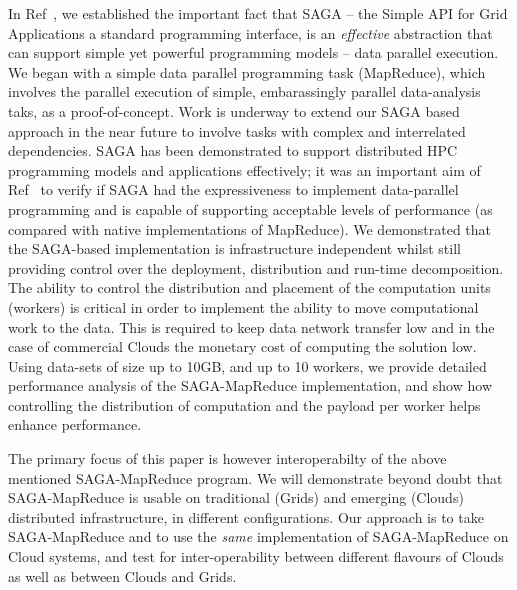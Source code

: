 \documentclass[conference,final]{IEEEtran}
\newcommand{\sagamapreduce }{SAGA-MapReduce }
\begin{document}
In Ref~\cite{saga_ccgrid09}, we established the important fact that
SAGA -- the Simple API for Grid Applications a standard programming
interface, is an {\it effective} abstraction that can support simple
yet powerful programming models -- data parallel execution.  We began
with a simple data parallel programming task (MapReduce), which
involves the parallel execution of simple, embarassingly parallel
data-analysis taks, as a proof-of-concept.  Work is underway to extend
our SAGA based approach in the near future to involve tasks with
complex and interrelated dependencies. SAGA has been demonstrated to
support distributed HPC programming models and applications
effectively; it was an important aim of Ref~\cite{saga_ccgrid09} to
verify if SAGA had the expressiveness to implement data-parallel
programming and is capable of supporting acceptable levels of
performance (as compared with native implementations of MapReduce).
We demonstrated that the SAGA-based implementation is infrastructure
independent whilst still providing control over the deployment,
distribution and run-time decomposition.  The ability to control the
distribution and placement of the computation units (workers) is
critical in order to implement the ability to move computational work
to the data. This is required to keep data network transfer low and in
the case of commercial Clouds the monetary cost of computing the
solution low. Using data-sets of size up to 10GB, and up to 10
workers, we provide detailed performance analysis of the
SAGA-MapReduce implementation, and show how controlling the
distribution of computation and the payload per worker helps enhance
performance.

The primary focus of this paper is however interoperabilty of the
above mentioned \sagamapreduce program.  We will demonstrate beyond
doubt that \sagamapreduce is usable on traditional (Grids) and
emerging (Clouds) distributed infrastructure, in different
configurations. Our approach is to take \sagamapreduce and to use the
{\it same} implementation of \sagamapreduce on Cloud systems, and test
for inter-operability between different flavours of Clouds as well as
between Clouds and Grids.
\end{document}

